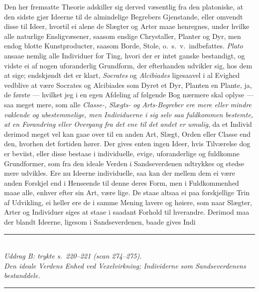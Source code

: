 \documentclass[12pt,a4paper]{article}
\newcommand{\spanhead}[1]{%
  \bigskip\begin{center}\rule{0.18\linewidth}{0.4pt}\\[6pt]
  {\small\itshape #1}\\[4pt]\rule{0.18\linewidth}{0.4pt}\end{center}\smallskip}
\newcommand{\opage}[1]{\marginnote{\footnotesize\textit{[#1]}}}
\begin{document}
Den her fremsatte Theorie adskiller sig derved væsentlig fra den platoniske, at
den sidste gjør Ideerne til de almindelige Begrebers Gjenstande, eller omvendt
disse til Ideer, hvortil ei alene de Slægter og Arter maae henregnes, under hvilke
alle naturlige Ensligvæsener, saasom enslige Chrystaller, Planter og Dyr, men
endog blotte Kunstproducter, saasom Borde, Stole, o.~s.~v.\ indbefattes.
\emph{Plato} ansaae nemlig alle
\opage{207} Individuer for Ting, hvori der er intet ganske bestandigt, og vidste ei af nogen
uforanderlig Grundform, der efterhanden udvikler sig, hos dem at sige; endskjøndt
det er klart, \emph{Socrates} og \emph{Alcibiades} ligesaavel i al Evighed
vedblive at være Socrates og Alcibiades som Dyret et Dyr, Planten en Plante, ja,
de første --- hvilket jeg i en egen Afdeling af følgende Bog nærmere skal oplyse
--- saa meget mere, som alle \emph{Classe-, Slægts- og Arts-Begreber ere mere
eller mindre vaklende og ubestemmelige, men Individuerne i sig selv saa fuldkommen
bestemte, at en Forandring eller Overgang fra det ene til det andet er umulig},
da et Individ derimod meget vel kan gaae over til en anden Art, Slægt, Orden eller
Classe end den, hvorhen det fortiden hører. Der gives enten ingen Ideer, hvis
Tilværelse dog er beviist, eller disse bestaae i individuelle, evige,
uforanderlige og fuldkomne Grundformer, som fra den ideale Verden i
Sandseverdenen udtrykkes og stedse mere udvikles. Ere nu Ideerne individuelle, saa
kan der mellem dem ei være anden Forskjel end i Henseende til denne deres Form,
men i Fuldkommenhed maae alle, enhver efter sin Art, være lige. De staae altsaa ei
paa forskjellige Trin af Udvikling, ei heller ere de i samme Mening lavere og
høiere, som naar Slægter, Arter og Individuer siges at staae i saadant Forhold til
hverandre. Derimod maa der blandt Ideerne, ligesom i Sandseverdenen, baade gives
Indi

\spanhead{Uddrag B: trykte s.\ 220--221 (scan 274--275).\\
  Den ideale Verdens Enhed ved Vexelvirkning; Individerne som Sandseverdenens
  bestanddele.}
\end{document}
